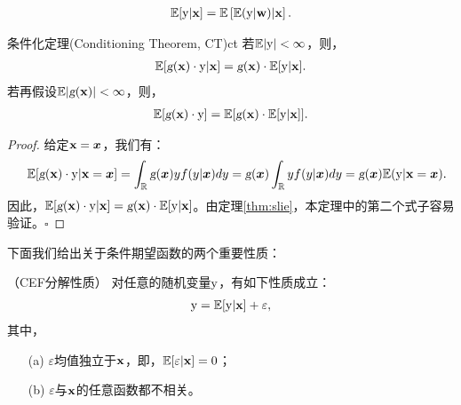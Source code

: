 \documentclass[cn,11pt,chinese]{elegantbook}
\begin{document}
\begin{eqnarray*}
	\mathbb{E}[\rm{y}|\bold{x}]=\mathbb{E}\left[\mathbb{E}(\rm{y}|\bold{w})|\bold{x}\right].
\end{eqnarray*}
\begin{theorem}{条件化定理(Conditioning Theorem, CT)}{ct}
	若$\mathbb{E}|\rm{y}|<\infty$，则，
	\begin{eqnarray*}
	    \mathbb{E}[\textsl{g}(\bold{x})\cdot \rm{y}|\bold{x}]=\textsl{g}(\bold{x})\cdot \mathbb{E}[\rm{y}|\bold{x}].
	\end{eqnarray*}
	若再假设$\mathbb{E}|\textsl{g}(\bold{x})|<\infty$，则，
	\begin{eqnarray*}
		\mathbb{E}[\textsl{g}(\bold{x})\cdot \rm{y}]=\mathbb{E}[\textsl{g}(\bold{x})\cdot \mathbb{E}[\rm{y}|\bold{x}]].
	\end{eqnarray*}
\end{theorem}
\begin{proof}
给定$\bold{x}=\boldsymbol{x}$，我们有：
\begin{eqnarray*}
	&&\mathbb{E}[\textsl{g}({\bold{x}})\cdot {\rm{y}}|{\bold{x}}={\boldsymbol{x}}] = \int_{\mathbb{R}}{\textsl{g}}({\boldsymbol{x}})yf(y|{\boldsymbol{x}})dy={\textsl{g}}({\boldsymbol{x}})\int_{\mathbb{R}}yf(y|{\boldsymbol{x}})dy={\textsl{g}}({\boldsymbol{x}})\mathbb{E}({\rm{y}}|{\bold{x}}={\boldsymbol{x}}).
\end{eqnarray*}
因此，$\mathbb{E}[\textsl{g}(\bold{x})\cdot \rm{y}|\bold{x}]=\textsl{g}(\bold{x})\cdot \mathbb{E}[\rm{y}|\bold{x}]$。由定理\ref{thm:slie}，本定理中的第二个式子容易验证。\hfill$\square$
\end{proof}
下面我们给出关于条件期望函数的两个重要性质：
\begin{property}{（CEF分解性质）}
	对任意的随机变量$\rm{y}$，有如下性质成立：
	\begin{eqnarray*}
	{\rm{y}} = \mathbb{E}[{\rm{y}}|\bold{x}]+\varepsilon,
    \end{eqnarray*}
    其中，
    \begin{itemize}
    	\item[(a)] $\varepsilon$均值独立于$\bold{x}$，即，$\mathbb{E}[\varepsilon|\bold{x}]=0$；
    	\item[(b)] $\varepsilon$与$\bold{x}$的任意函数都不相关。
    \end{itemize}
\end{property}
\end{document}
